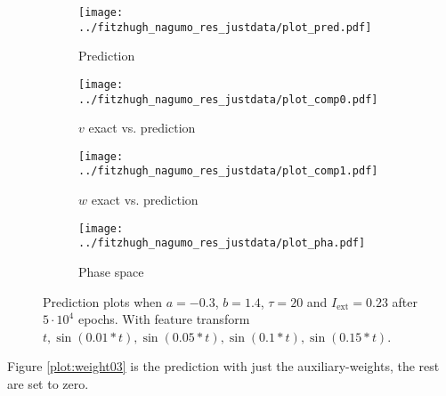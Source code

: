 \documentclass[a4paper]{article}
\begin{document}
\begin{figure}[H]
	\centering 
	\begin{subfigure}[b]{0.47\textwidth}
		\centering
		\texttt{[image: ../fitzhugh\_nagumo\_res\_justdata/plot\_pred.pdf]}
		\caption{Prediction}
		\label{fig:weight02a}
	\end{subfigure}
	\begin{subfigure}[b]{0.47\textwidth}
		\centering
		\texttt{[image: ../fitzhugh\_nagumo\_res\_justdata/plot\_comp0.pdf]}
		\caption{$v$ exact vs. prediction}
		\label{fig:weight02b}
	\end{subfigure}
	\begin{subfigure}[b]{0.47\textwidth}
		\centering
		\texttt{[image: ../fitzhugh\_nagumo\_res\_justdata/plot\_comp1.pdf]}
		\caption{$w$ exact vs. prediction}
		\label{fig:weight02c}
	\end{subfigure}
	\begin{subfigure}[b]{0.47\textwidth}
		\centering
		\texttt{[image: ../fitzhugh\_nagumo\_res\_justdata/plot\_pha.pdf]}
		\caption{Phase space}
		\label{fig:weight02d}
	\end{subfigure}
	\caption{Prediction plots when $a=-0.3$, $b=1.4$, $\tau=20$ and $ I_{\text{ext}}=0.23$ after $5\cdot10^4$ epochs. With feature transform $t, \sin(0.01 * t), \sin(0.05 * t), \sin(0.1 * t), \sin(0.15 * t)$.}
	\label{plot:weight02}
\end{figure}

Figure \ref{plot:weight03} is the prediction with just the auxiliary-weights, the rest are set to zero.
\end{document}

